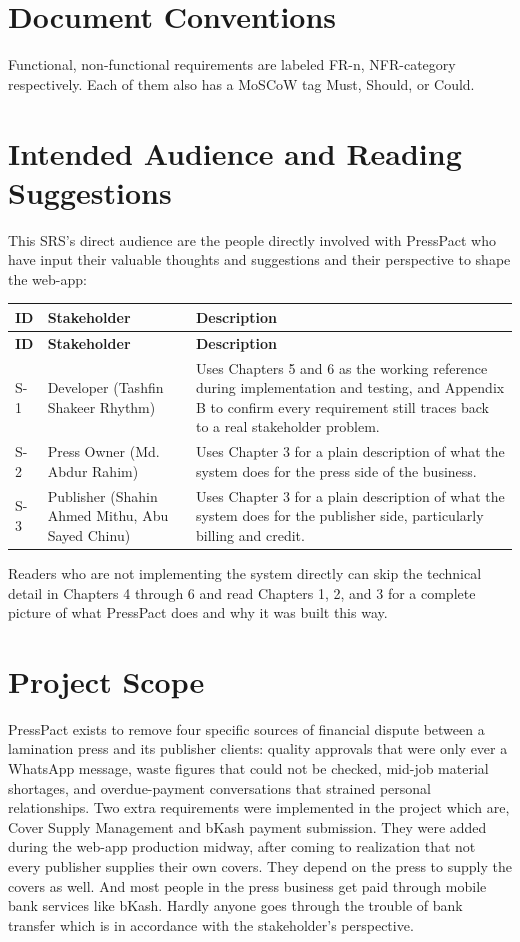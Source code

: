 \documentclass{scrreprt}
\begin{document}
\section{Document Conventions}
Functional, non-functional requirements are labeled FR-n, NFR-category respectively. Each of them also has a MoSCoW tag Must, Should, or Could.

\section{Intended Audience and Reading Suggestions}
This SRS's direct audience are the people directly involved with PressPact who have input their valuable thoughts and suggestions and their perspective to shape the web-app:

\begin{longtable}{L{0.10\textwidth} L{0.30\textwidth} L{0.60\textwidth}}
\toprule
{} \textbf{ID} & \textbf{Stakeholder} & \textbf{Description} \\
\midrule
\endfirsthead
\toprule
{} \textbf{ID} & \textbf{Stakeholder} & \textbf{Description} \\
\midrule
\endhead
S-1 & Developer (Tashfin Shakeer Rhythm) & Uses Chapters 5 and 6 as the working reference during implementation and testing, and Appendix B to confirm every requirement still traces back to a real stakeholder problem. \\
S-2 & Press Owner (Md. Abdur Rahim) & Uses Chapter 3 for a plain description of what the system does for the press side of the business. \\
S-3 & Publisher (Shahin Ahmed Mithu, Abu Sayed Chinu) & Uses Chapter 3 for a plain description of what the system does for the publisher side, particularly billing and credit. \\
\bottomrule
\end{longtable}

Readers who are not implementing the system directly can skip the technical detail in Chapters 4 through 6 and read Chapters 1, 2, and 3 for a complete picture of what PressPact does and why it was built this way.

\section{Project Scope}
PressPact exists to remove four specific sources of financial dispute between a lamination press and its publisher clients: quality approvals that were only ever a WhatsApp message, waste figures that could not be checked, mid-job material shortages, and overdue-payment conversations that strained personal relationships. Two extra requirements were implemented in the project which are, Cover Supply Management and bKash payment submission. They were added during the web-app production midway, after coming to realization that not every publisher supplies their own covers. They depend on the press to supply the covers as well. And most people in the press business get paid through mobile bank services like bKash. Hardly anyone goes through the trouble of bank transfer which is in accordance with the stakeholder's perspective.
\end{document}
